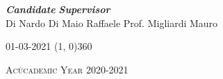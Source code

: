 \begin{titlepage}
\vspace{3cm}
\begin{normalsize}
\begin{flushleft}
  
  \hspace{62pt} \textbf{\textit{Candidate}} \hspace{130pt} \textbf{\textit{Supervisor}}\\
  \vspace{5pt}
  \hspace{27pt} {Di Nardo Di Maio Raffaele} \hspace{65pt} {Prof. Migliardi Mauro}\\
\end{flushleft}
\end{normalsize}

\vfill
\begin{center}
\textsc{01-03-2021}
\hspace{-0.2cm}
\line(1, 0){360}

\textsc{Acùcademic Year 2020-2021}
\end{center}
\end{titlepage}
\cleardoublepage %
\thispagestyle{empty}
\addtolength{\oddsidemargin}{+0.7cm}